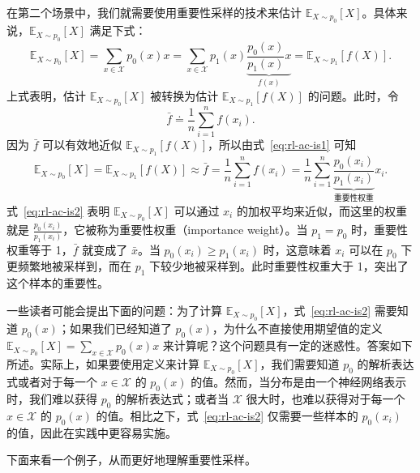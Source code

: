 在第二个场景中，我们就需要使用重要性采样的技术来估计 $\mathbb{E}_{X \sim p_{0}}[X]$。具体来说，$\mathbb{E}_{X \sim p_{0}}[X]$ 满足下式：
\begin{equation}
\mathbb{E}_{X \sim p_{0}}[X] = \sum_{x \in \mathcal{X}} p_{0}(x) x = \sum_{x \in \mathcal{X}} p_{1}(x) \underbrace{\frac{p_{0}(x)}{p_{1}(x)} x}_{f(x)} = \mathbb{E}_{X \sim p_{1}}[f(X)].
\label{eq:rl-ac-is1}
\end{equation}
上式表明，估计 $\mathbb{E}_{X \sim p_{0}}[X]$ 被转换为估计 $\mathbb{E}_{X \sim p_{1}}[f(X)]$ 的问题。此时，令
\[
\bar{f} \doteq \frac{1}{n} \sum_{i=1}^{n} f(x_{i}).
\]
因为 $\bar{f}$ 可以有效地近似 $\mathbb{E}_{X \sim p_{1}}[f(X)]$，所以由式~\eqref{eq:rl-ac-is1} 可知
\begin{equation}
\mathbb{E}_{X \sim p_{0}}[X] = \mathbb{E}_{X \sim p_{1}}[f(X)] \approx \bar{f} = \frac{1}{n} \sum_{i=1}^{n} f(x_{i}) = \frac{1}{n} \sum_{i=1}^{n} \underbrace{\frac{p_{0}(x_{i})}{p_{1}(x_{i})}}_{\text{重要性权重}} x_{i}.
\label{eq:rl-ac-is2}
\end{equation}
式~\eqref{eq:rl-ac-is2} 表明 $\mathbb{E}_{X \sim p_{0}}[X]$ 可以通过 $x_{i}$ 的加权平均来近似，而这里的权重就是 $\frac{p_{0}(x_{i})}{p_{1}(x_{i})}$，它被称为重要性权重（importance weight）。当 $p_{1} = p_{0}$ 时，重要性权重等于 1，$\bar{f}$ 就变成了 $\bar{x}$。当 $p_{0}(x_{i}) \geqslant p_{1}(x_{i})$ 时，这意味着 $x_{i}$ 可以在 $p_{0}$ 下更频繁地被采样到，而在 $p_{1}$ 下较少地被采样到。此时重要性权重大于 1，突出了这个样本的重要性。

一些读者可能会提出下面的问题：为了计算 $\mathbb{E}_{X \sim p_{0}}[X]$，式~\eqref{eq:rl-ac-is2} 需要知道 $p_{0}(x)$；如果我们已经知道了 $p_{0}(x)$，为什么不直接使用期望值的定义 $\mathbb{E}_{X \sim p_{0}}[X] = \sum_{x \in \mathcal{X}} p_{0}(x) x$ 来计算呢？这个问题具有一定的迷惑性。答案如下所述。实际上，如果要使用定义来计算 $\mathbb{E}_{X \sim p_{0}}[X]$，我们需要知道 $p_{0}$ 的解析表达式或者对于每一个 $x \in \mathcal{X}$ 的 $p_{0}(x)$ 的值。然而，当分布是由一个神经网络表示时，我们难以获得 $p_{0}$ 的解析表达式；或者当 $\mathcal{X}$ 很大时，也难以获得对于每一个 $x \in \mathcal{X}$ 的 $p_{0}(x)$ 的值。相比之下，式~\eqref{eq:rl-ac-is2} 仅需要一些样本的 $p_{0}(x_{i})$ 的值，因此在实践中更容易实施。

下面来看一个例子，从而更好地理解重要性采样。

